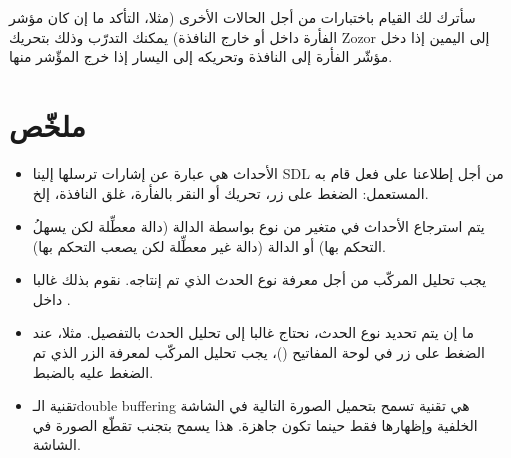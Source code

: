 سأترك لك القيام باختبارات من أجل الحالات الأخرى (مثلا، التأكد ما إن كان مؤشر الفأرة داخل أو خارج النافذة) يمكنك التدرّب وذلك بتحريك
\textenglish{Zozor}
إلى اليمين إذا دخل مؤشّر الفأرة إلى النافذة وتحريكه إلى اليسار إذا خرج المؤّشر منها.

\section*{ملخّص}

\begin{itemize}
	\item الأحداث هي عبارة عن إشارات ترسلها إلينا
	\textenglish{SDL}
	من أجل إطلاعنا على فعل قام به المستعمل: الضغط على زر، تحريك أو النقر بالفأرة، غلق النافذة، إلخ.
	\item يتم استرجاع الأحداث في متغير من نوع
	بواسطة الدالة
	(دالة معطِّلة لكن يسهلُ التحكم بها) أو الدالة 
	(دالة غير معطِّلة لكن يصعب التحكم بها).
	\item يجب تحليل المركّب
	من أجل معرفة نوع الحدث الذي تم إنتاجه. نقوم بذلك غالبا داخل 
	.
	\item ما إن يتم تحديد نوع الحدث، نحتاج غالبا إلى تحليل الحدث بالتفصيل. مثلا، عند الضغط على زر في لوحة المفاتيح
	()،
	يجب تحليل المركّب
	لمعرفة الزر الذي تم الضغط عليه بالضبط.
	\item تقنية الـ\textenglish{double buffering}
	هي تقنية تسمح بتحميل الصورة التالية في الشاشة الخلفية وإظهارها فقط حينما تكون جاهزة. هذا يسمح بتجنب تقطّع الصورة في الشاشة.
\end{itemize}
